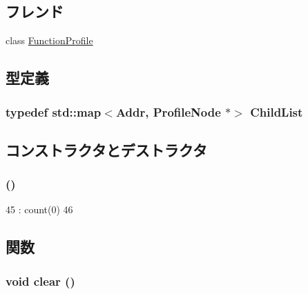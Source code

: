 \subsection*{フレンド}
\begin{DoxyCompactItemize}
\item 
class \hyperlink{classProfileNode_a3bca6eafa41585553190654e4128751e}{FunctionProfile}
\end{DoxyCompactItemize}


\subsection{型定義}
\hypertarget{classProfileNode_a25eaa93b63ca5aaa4ce454ca8f63fa05}{
\subsubsection[{ChildList}]{\setlength{\rightskip}{0pt plus 5cm}typedef std::map$<${\bf Addr}, {\bf ProfileNode} $\ast$$>$ {\bf ChildList}}}
\label{classProfileNode_a25eaa93b63ca5aaa4ce454ca8f63fa05}


\subsection{コンストラクタとデストラクタ}
\hypertarget{classProfileNode_a2f815a2f66dc2a06182d0a98063a6aeb}{
\subsubsection[{ProfileNode}]{ ()}}
\label{classProfileNode_a2f815a2f66dc2a06182d0a98063a6aeb}



\begin{DoxyCode}
45     : count(0)
46 { }
\end{DoxyCode}


\subsection{関数}
\hypertarget{classProfileNode_ac8bb3912a3ce86b15842e79d0b421204}{
\subsubsection[{clear}]{\setlength{\rightskip}{0pt plus 5cm}void clear ()}}
\label{classProfileNode_ac8bb3912a3ce86b15842e79d0b421204}



